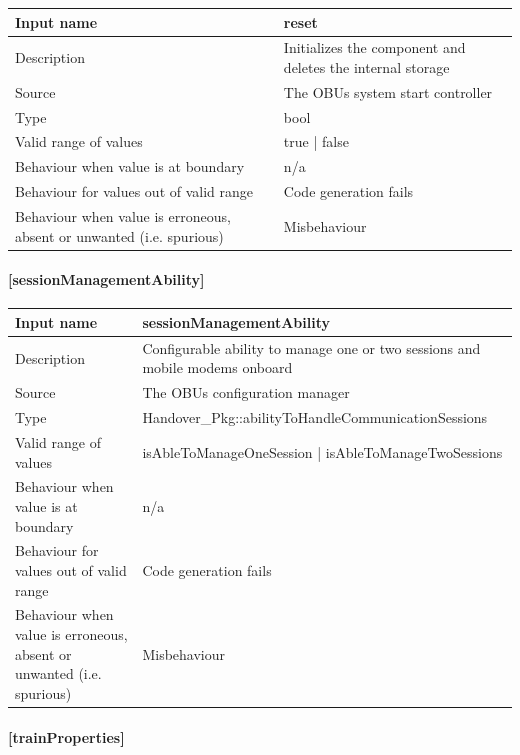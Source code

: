 \begin{longtable}{p{}p{}}
	\toprule
	Input name				& reset \\
	\midrule
	Description				& Initializes the component and deletes the internal storage \\
	\midrule
	Source					& The OBUs system start controller \\ 
	\midrule
	Type					& bool \\
	\midrule
	Valid range of values	& true | false \\
	\midrule
	Behaviour when value is at boundary	& n/a \\
	\midrule
	Behaviour for values out of valid range	& Code generation fails \\
	\midrule
	Behaviour when value is erroneous, absent or unwanted (i.e. spurious) & Misbehaviour \\
	\bottomrule
\end{longtable}

\paragraph{[sessionManagementAbility]}

\begin{longtable}{p{}p{}}
	\toprule
	Input name				& sessionManagementAbility \\
	\midrule
	Description				& Configurable ability to manage one or two sessions and mobile modems onboard \\
	\midrule
	Source					& The OBUs configuration manager \\ 
	\midrule
	Type					& Handover\_Pkg::abilityToHandleCommunicationSessions \\
	\midrule
	Valid range of values	& isAbleToManageOneSession | isAbleToManageTwoSessions \\
	\midrule
	Behaviour when value is at boundary	& n/a \\
	\midrule
	Behaviour for values out of valid range	& Code generation fails \\
	\midrule
	Behaviour when value is erroneous, absent or unwanted (i.e. spurious) & Misbehaviour \\
	\bottomrule
\end{longtable}

\paragraph{[trainProperties]}

